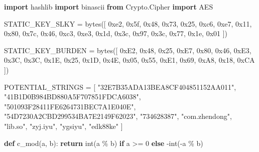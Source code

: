 \documentclass[
]{article}
\newenvironment{Shaded}{}{}
\newcommand{\BaseNTok}[1]{\textcolor[rgb]{0.25,0.63,0.44}{#1}}
\newcommand{\BuiltInTok}[1]{\textcolor[rgb]{0.00,0.50,0.00}{#1}}
\newcommand{\ControlFlowTok}[1]{\textcolor[rgb]{0.00,0.44,0.13}{\textbf{#1}}}
\newcommand{\DecValTok}[1]{\textcolor[rgb]{0.25,0.63,0.44}{#1}}
\newcommand{\ImportTok}[1]{\textcolor[rgb]{0.00,0.50,0.00}{\textbf{#1}}}
\newcommand{\KeywordTok}[1]{\textcolor[rgb]{0.00,0.44,0.13}{\textbf{#1}}}
\newcommand{\NormalTok}[1]{#1}
\newcommand{\OperatorTok}[1]{\textcolor[rgb]{0.40,0.40,0.40}{#1}}
\newcommand{\StringTok}[1]{\textcolor[rgb]{0.25,0.44,0.63}{#1}}
\begin{document}
\begin{Shaded}
\begin{Highlighting}[]

\ImportTok{import}\NormalTok{ hashlib}
\ImportTok{import}\NormalTok{ binascii}
\ImportTok{from}\NormalTok{ Crypto.Cipher }\ImportTok{import}\NormalTok{ AES}

\NormalTok{STATIC\_KEY\_SLKY }\OperatorTok{=} \BuiltInTok{bytes}\NormalTok{([}
    \BaseNTok{0xe2}\NormalTok{, }\BaseNTok{0x5f}\NormalTok{, }\BaseNTok{0x48}\NormalTok{, }\BaseNTok{0x73}\NormalTok{, }\BaseNTok{0x25}\NormalTok{, }\BaseNTok{0xc6}\NormalTok{, }\BaseNTok{0xe7}\NormalTok{, }\BaseNTok{0x11}\NormalTok{, }
    \BaseNTok{0x80}\NormalTok{, }\BaseNTok{0x7c}\NormalTok{, }\BaseNTok{0x46}\NormalTok{, }\BaseNTok{0xc3}\NormalTok{, }\BaseNTok{0xe3}\NormalTok{, }\BaseNTok{0x1d}\NormalTok{, }\BaseNTok{0x3c}\NormalTok{, }\BaseNTok{0x97}\NormalTok{, }
    \BaseNTok{0x3c}\NormalTok{, }\BaseNTok{0x77}\NormalTok{, }\BaseNTok{0x1e}\NormalTok{, }\BaseNTok{0x01}
\NormalTok{])}

\NormalTok{STATIC\_KEY\_BURDEN }\OperatorTok{=} \BuiltInTok{bytes}\NormalTok{([}
    \BaseNTok{0xE2}\NormalTok{, }\BaseNTok{0x48}\NormalTok{, }\BaseNTok{0x25}\NormalTok{, }\BaseNTok{0xE7}\NormalTok{, }\BaseNTok{0x80}\NormalTok{, }\BaseNTok{0x46}\NormalTok{, }\BaseNTok{0xE3}\NormalTok{, }\BaseNTok{0x3C}\NormalTok{,}
    \BaseNTok{0x3C}\NormalTok{, }\BaseNTok{0x1E}\NormalTok{, }\BaseNTok{0x25}\NormalTok{, }\BaseNTok{0x1D}\NormalTok{, }\BaseNTok{0x4E}\NormalTok{, }\BaseNTok{0x05}\NormalTok{, }\BaseNTok{0x55}\NormalTok{, }\BaseNTok{0xE1}\NormalTok{,}
    \BaseNTok{0x69}\NormalTok{, }\BaseNTok{0xA8}\NormalTok{, }\BaseNTok{0x18}\NormalTok{, }\BaseNTok{0xCA}
\NormalTok{])}

\NormalTok{POTENTIAL\_STRINGS }\OperatorTok{=}\NormalTok{ [}
    \StringTok{"32E7B35ADA13BEA8CF404851152AA011"}\NormalTok{,}
    \StringTok{"41B1D0B984BD880A5F707851FDCA6038"}\NormalTok{,}
    \StringTok{"501093F28411FE6264731BEC7A1E040E"}\NormalTok{,}
    \StringTok{"54D7230A2CBD299534BA7E2149F62023"}\NormalTok{,}
    \StringTok{"734628387"}\NormalTok{,}
    \StringTok{"com.zhendong"}\NormalTok{,}
    \StringTok{"lib.so"}\NormalTok{,}
    \StringTok{"zyj.iyu"}\NormalTok{,}
    \StringTok{"ygsiyu"}\NormalTok{,}
    \StringTok{"edk88ke"}
\NormalTok{]}

\KeywordTok{def}\NormalTok{ c\_mod(a, b):}
    \ControlFlowTok{return} \BuiltInTok{int}\NormalTok{(a }\OperatorTok{\%}\NormalTok{ b) }\ControlFlowTok{if}\NormalTok{ a }\OperatorTok{\textgreater{}=} \DecValTok{0} \ControlFlowTok{else} \OperatorTok{{-}}\BuiltInTok{int}\NormalTok{(}\OperatorTok{{-}}\NormalTok{a }\OperatorTok{\%}\NormalTok{ b)}


\end{Highlighting}
\end{Shaded}
\end{document}
